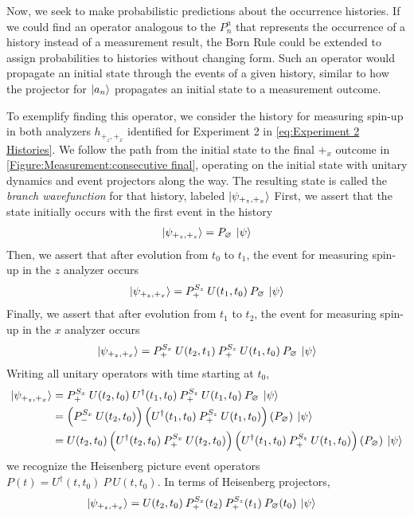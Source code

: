 Now, we seek to make probabilistic predictions about the occurrence histories. If we could find an operator analogous to the $P^a_n$ that represents the occurrence of a history instead of a measurement result, the Born Rule could be extended to assign probabilities to histories without changing form. Such an operator would propagate an initial state through the events of a given history, similar to how the projector for $\ket{a_n}$ propagates an initial state to a measurement outcome.

To exemplify finding this operator, we consider the history for measuring spin-up in both analyzers $h_{+_z, +_x}$ identified for Experiment 2 in \autoref{eq:Experiment 2 Histories}. We follow the path from the initial state to the final $+_x$ outcome in \autoref{Figure:Measurement:consecutive final}, operating on the initial state with unitary dynamics and event projectors along the way. The resulting state is called the \textit{branch wavefunction} for that history, labeled $\ket{\psi_{+_z, +_x}}$  First, we assert that the state initially occurs with the first event in the history
\begin{align}
  \ket{\psi_{+_z, +_z}} = P_\varnothing \: \ket{\psi}
\end{align}
Then, we assert that after evolution from $t_0$ to $t_1$, the event for measuring spin-up in the $z$ analyzer occurs
\begin{align}
  \ket{\psi_{+_z, +_x}} = P^{S_z}_+ \: U(t_1, t_0) \: P_\varnothing \: \ket{\psi}
\end{align}
Finally, we assert that after evolution from $t_1$ to $t_2$, the event for measuring spin-up in the $x$ analyzer occurs
\begin{align}
  \ket{\psi_{+_z, +_x}} = P^{S_x}_+ \: U(t_2, t_1) \: P^{S_z}_+ \: U(t_1, t_0) \: P_\varnothing \: \ket{\psi}
\end{align}
Writing all unitary operators with time starting at $t_0$,
\begin{align}
  \ket{\psi_{+_z, +_x}} &= P^{S_x}_+ \: U(t_2, t_0) \: U^\dagger(t_1, t_0) \: P^{S_z}_+ \: U(t_1, t_0) \: P_\varnothing \: \ket{\psi} \\ \nonumber
  &= \left(P^{S_x}_- \: U(t_2, t_0) \right) \left( U^\dagger(t_1, t_0) \: P^{S_z}_+ \: U(t_1, t_0) \right) \left( P_\varnothing \right) \: \ket{\psi} \\ \nonumber
  &= U(t_2, t_0)\left(U^\dagger(t_2, t_0) \: P^{S_x}_+ \: U(t_2, t_0) \right) \left( U^\dagger(t_1, t_0) \: P^{S_z}_+ \: U(t_1, t_0) \right) \left( P_\varnothing \right) \: \ket{\psi}
\end{align}
we recognize the Heisenberg picture event operators ${P}(t) = U^\dagger(t, t_0) \: P \: U(t, t_0)$. In terms of Heisenberg projectors,
\begin{align} \label{eq:branch wavefunction}
  \ket{\psi_{+_z, +_x}} &= U(t_2, t_0) \: {P^{S_x}_+(t_2)} \: {P^{S_z}_+(t_1)} \: {P_\varnothing(t_0)} \: \ket{\psi}
\end{align}

